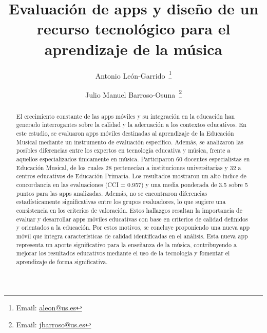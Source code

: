 \documentclass[spanish]{textolivre}
\title{Evaluación de apps y diseño de un recurso tecnológico para el aprendizaje de la música}
\author[1]{Antonio León-Garrido~\orcid{0000-0002-4850-596X}\thanks{Email: \href{mailto:aleon@us.es}{aleon@us.es}}}
\author[1]{Julio Manuel Barroso-Osuna~\orcid{0000-0002-4850-596X}\thanks{Email: \href{mailto:jbarroso@us.es}{jbarroso@us.es}}}
\affil[1]{Universidad de Sevilla, Facultad de Ciencias de la Educación, Departamento de Didáctica y Organización Educativa, Sevilla, Andalucía, España.}
\begin{document}
\maketitle

\begin{polyabstract}
\begin{abstract}
El crecimiento constante de las apps móviles y su integración en la educación han generado interrogantes sobre la calidad y la adecuación a los contextos educativos. En este estudio, se evaluaron apps móviles destinadas al aprendizaje de la Educación Musical mediante un instrumento de evaluación específico. Además, se analizaron las posibles diferencias entre los expertos en tecnología educativa y música, frente a aquellos especializados únicamente en música. Participaron 60 docentes especialistas en Educación Musical, de los cuales 28 pertenecían a instituciones universitarias y 32 a centros educativos de Educación Primaria. Los resultados mostraron un alto índice de concordancia en las evaluaciones (CCI = 0.957) y una media ponderada de 3.5 sobre 5 puntos para las apps analizadas. Además, no se encontraron diferencias estadísticamente significativas entre los grupos evaluadores, lo que sugiere una consistencia en los criterios de valoración. Estos hallazgos resaltan la importancia de evaluar y desarrollar apps móviles educativas con base en criterios de calidad definidos y orientados a la educación. Por estos motivos, se concluye proponiendo una nueva app móvil que integra características de calidad identificadas en el análisis. Esta nueva app representa un aporte significativo para la enseñanza de la música, contribuyendo a mejorar los resultados educativos mediante el uso de la tecnología y fomentar el aprendizaje de forma significativa. 

\end{abstract}


\end{polyabstract}
\end{document}

